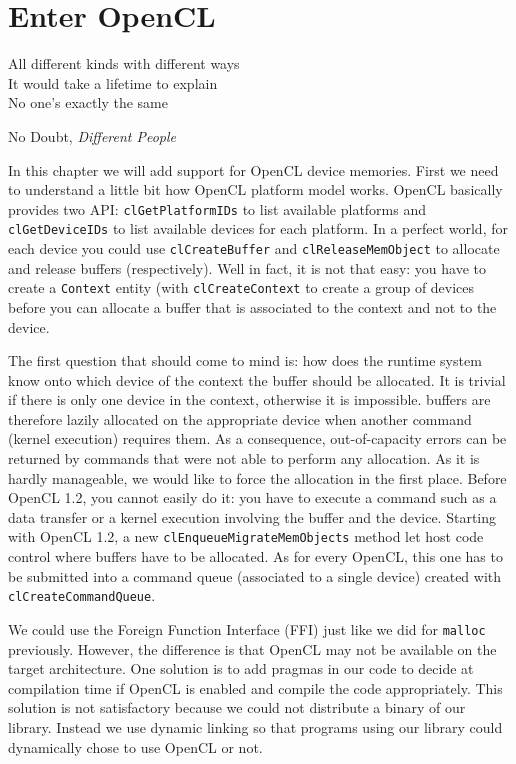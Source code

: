 \chapter{Enter OpenCL}

\epigraph{
All different kinds with different ways\\
It would take a lifetime to explain\\
No one's exactly the same}
{No Doubt, \textit{Different People}}

In this chapter we will add support for OpenCL device memories. First we need to
understand a little bit how OpenCL platform model works. OpenCL basically
provides two API: \texttt{clGetPlatformIDs} to list available platforms and
\texttt{clGetDeviceIDs} to list available devices for each platform. In a
perfect world, for each device you could use \texttt{clCreateBuffer} and
\texttt{clReleaseMemObject} to allocate and release buffers (respectively). Well
in fact, it is not that easy: you have to create a \texttt{Context} entity (with
\texttt{clCreateContext} to create a group of devices before you can allocate a
buffer that is associated to the context and not to the device.

The first question that should come to mind is: how does the runtime system know
onto which device of the context the buffer should be allocated. It is trivial
if there is only one device in the context, otherwise it is impossible. 
buffers are therefore lazily allocated on the appropriate device when another
command (\eg kernel execution) requires them.
As a consequence, out-of-capacity errors can be returned by commands that were
not able to perform any allocation.
As it is hardly
manageable, we would like to force the allocation in the first place. Before
OpenCL 1.2, you cannot easily do it: you have to execute a command such as a
data transfer or a kernel execution involving the buffer and the device.
Starting with OpenCL 1.2, a new \texttt{clEnqueueMigrateMemObjects} method let
host code control where buffers have to be allocated.
As for every OpenCL, this
one has to be submitted into a command queue (associated to a single device)
created with \texttt{clCreateCommandQueue}.

We could use the Foreign Function Interface (FFI) just like we did for
\texttt{malloc} previously. However, the difference is that OpenCL may not be
available on the target architecture. One solution is to add pragmas in our code
to decide at compilation time if OpenCL is enabled and compile the code
appropriately. This solution is not satisfactory because we could not distribute
a binary of our library. Instead we use dynamic linking so that programs using
our library could dynamically chose to use OpenCL or not.

